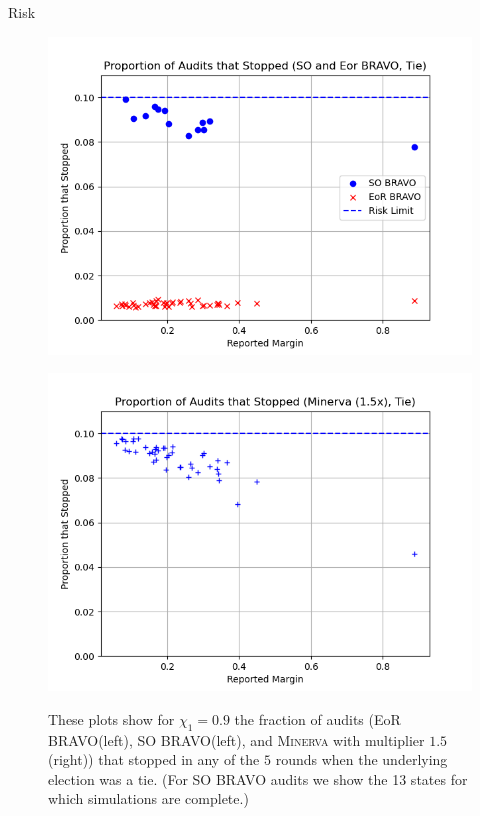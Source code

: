 \documentclass[final]{beamer}
\newcommand{\Minerva}{\textsc{Minerva}\xspace}
\newcommand{\BRAVO}{\textsc{BRAVO}\xspace}
\newlength{\colwidth}
\begin{document}
\begin{frame}[t]
\begin{columns}[t]
\begin{column}{\colwidth}
\begin{block}{Risk}
\begin{figure}[h]
\centering
\begin{minipage}{.49\textwidth}
\includegraphics[width=\textwidth]{bravo_risks.png}
\label{fig:bravo_risk}
\end{minipage}
\begin{minipage}{.49\textwidth}
\includegraphics[width=1.0\textwidth]{riskminerva1p5_10t4.png}
\label{fig:minerva_risk}
\end{minipage}
\caption{These plots show for $\chi_1=0.9$ the fraction of audits (EoR \BRAVO (left), SO \BRAVO (left), and \Minerva with multiplier $1.5$ (right)) that stopped in any of the $5$ rounds when the underlying election was a tie. (For SO \BRAVO audits we show the 13 states for which simulations are complete.)}
\end{figure}


\end{block}
\end{column}
\end{columns}
\end{frame}
\end{document}
